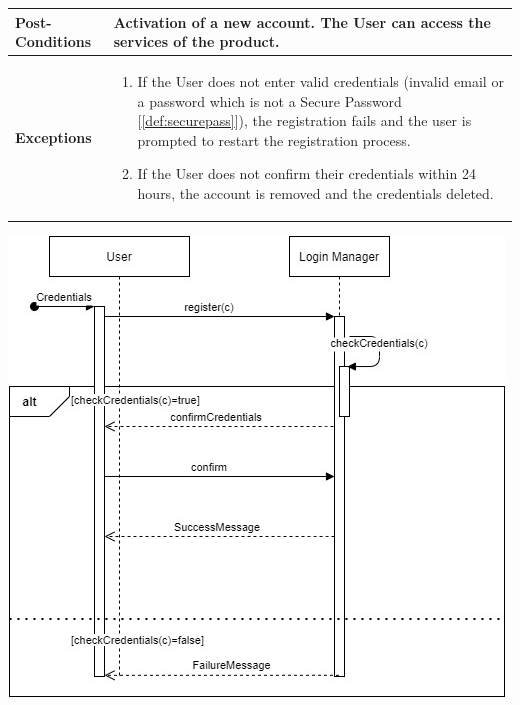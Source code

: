 \documentclass[a4paper, 12pt, oneside]{article}
\begin{document}
\begin{enumerate}[labelindent=20pt, label={UC.\arabic*}, itemindent=1em,leftmargin=!]
\begin{tabularx}{\linewidth}{| l | X |}
    \hline
    \textbf{Post-Conditions} & Activation of a new account. The User can access the services of the product.\\
    
    \hline
    \textbf{Exceptions} & \parbox{0.7\textwidth}{ \begin{enumerate}
            \item If the User does not enter valid credentials (invalid email or a password which is not a Secure Password [\ref{def:securepass}]), the registration fails and the user is prompted to restart the registration process.
            \item If the User does not confirm their credentials within 24 hours, the account is removed and the credentials deleted.
        \end{enumerate}}\\

    \hline
    
\end{tabularx}

\begin{minipage}{\linewidth}
            \centering
           \includegraphics[height=0.5\textheight, scale=1, keepaspectratio]{img/seq_diag/Register.jpg}
\end{minipage}


\end{enumerate}
\end{document}
